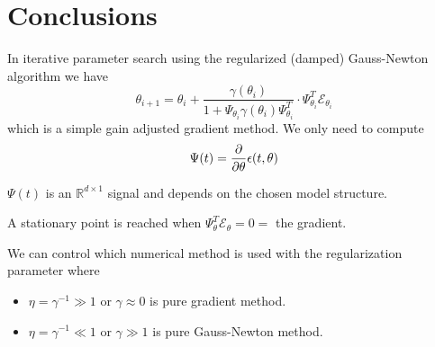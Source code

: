 \section{Conclusions}
In iterative parameter search using the regularized (damped) Gauss-Newton algorithm we have
$$\theta_{i+1} = \theta_i + \frac{\gamma(\theta_i)}{1+\Psi_{\theta_i}\gamma(\theta_i)\Psi_{\theta_i}^T}\cdot \Psi_{\theta_i}^T\mathcal{E}_{\theta_i}$$
which is a simple gain adjusted gradient method. We only need to compute
$$\Psi(t) = \frac{\partial}{\partial\theta}\epsilon(t,\theta)$$

$\Psi(t)$ is an $\mathbb{R}^{d\times1}$ signal and depends on the chosen model structure.

A stationary point is reached when $\Psi_\theta^T\mathcal{E}_\theta=0=$ the gradient.

We can control which numerical method is used with the regularization parameter where
\begin{itemize}
\item $\eta = \gamma^{-1} \gg 1$ or $\gamma\approx0$ is pure gradient method.
\item $\eta = \gamma^{-1} \ll 1$ or $\gamma\gg1$ is pure Gauss-Newton method.
\end{itemize}
